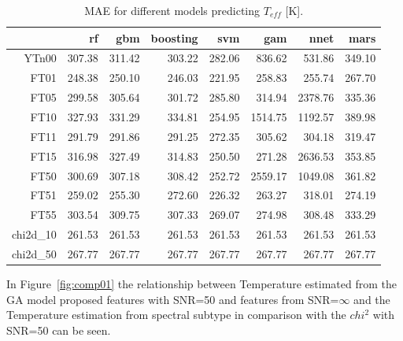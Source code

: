 {\begin{table}[ht]
\centering
\begin{tabular}{rrrrrrrr}
  \hline
 & rf & gbm & boosting & svm & gam & nnet & mars \\ 
  \hline
YTn00 & 307.38 & 311.42 & 303.22 & 282.06 & 836.62 & 531.86 & 349.10 \\ 
  FT01 & 248.38 & 250.10 & 246.03 & 221.95 & 258.83 & 255.74 & 267.70 \\ 
  FT05 & 299.58 & 305.64 & 301.72 & 285.80 & 314.94 & 2378.76 & 335.36 \\ 
  FT10 & 327.93 & 331.29 & 334.81 & 254.95 & 1514.75 & 1192.57 & 389.98 \\ 
  FT11 & 291.79 & 291.86 & 291.25 & 272.35 & 305.62 & 304.18 & 319.47 \\ 
  FT15 & 316.98 & 327.49 & 314.83 & 250.50 & 271.28 & 2636.53 & 353.85 \\ 
  FT50 & 300.69 & 307.18 & 308.42 & 252.72 & 2559.17 & 1049.08 & 361.82 \\ 
  FT51 & 259.02 & 255.30 & 272.60 & 226.32 & 263.27 & 318.01 & 274.19 \\ 
  FT55 & 303.54 & 309.75 & 307.33 & 269.07 & 274.98 & 308.48 & 333.29 \\ 
  chi2d\_10 & 261.53 & 261.53 & 261.53 & 261.53 & 261.53 & 261.53 & 261.53 \\ 
  chi2d\_50 & 267.77 & 267.77 & 267.77 & 267.77 & 267.77 & 267.77 & 267.77 \\ 
   \hline
\end{tabular}
\caption { MAE for different models predicting $T_{eff}$ [K].} 
\label{tab:models_T_mae} 
\end{table}


In Figure~\ref{fig:comp01} the relationship between Temperature estimated from 
the GA model proposed features with SNR=50 and features from SNR=$\infty$ 
and the Temperature estimation from spectral subtype 
in comparison with the $chi^2$ with SNR=50 can be seen.

}
